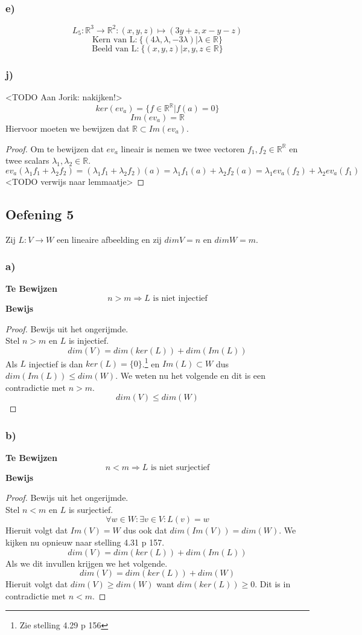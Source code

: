 \documentclass[lineaire_algebra_oplossingen.tex]{subfiles}
\begin{document}
\subsubsection*{e)}
$$
L_5:\mathbb{R}^3\rightarrow\mathbb{R}^2:(x,y,z)\mapsto (3y+z,x-y-z)
$$
$$
\text{Kern van L:} \ \{(4\lambda ,\lambda ,-3\lambda)|\lambda \in \mathbb{R} \}
$$
$$
\text{Beeld van L:} \ \{(x ,y ,z)|x,y,z \in \mathbb{R} \}
$$

\subsubsection*{j)}
<TODO Aan Jorik: nakijken!>
\[
ker(ev_a) = \{ f \in \mathbb{R}^{\mathbb{R}} | f(a) = 0\}
\]
\[
Im(ev_a) = \mathbb{R}
\]
Hiervoor moeten we bewijzen dat $\mathbb{R} \subset Im(ev_a)$.
\begin{proof}
Om te bewijzen dat $ev_a$ lineair is nemen we twee vectoren $f_1,f_2 \in \mathbb{R}^{\mathbb{R}}$ en twee scalars $\lambda_1, \lambda_2 \in \mathbb{R}$.
\[
ev_a(\lambda_1f_1 + \lambda_2f_2) = (\lambda_1f_1 + \lambda_2f_2)(a) = \lambda_1f_1(a) + \lambda_2f_2(a) = \lambda_1ev_a(f_2) + \lambda_2ev_a(f_1)
\]
<TODO verwijs naar lemmaatje>
\end{proof}

\subsection{Oefening 5}
Zij $L:V \rightarrow W$ een lineaire afbeelding en zij $dim V = n$ en $dim W = m$.\\
\subsubsection*{a)}
\textbf{Te Bewijzen}
\[
n > m \Rightarrow L \text{ is niet injectief}
\]
\textbf{Bewijs}
\begin{proof}
Bewijs uit het ongerijmde.\\
Stel $n>m$ en $L$ is injectief.
\[
dim(V) = dim(ker(L)) + dim(Im(L))
\]
Als $L$ injectief is dan $ker(L)=\{0\}$.\footnote{Zie stelling 4.29 p 156} en $Im(L) \subset W$ dus $dim(Im(L))\le dim(W)$. We weten nu het volgende en dit is een contradictie met $n>m$.
\[
dim(V) \le dim(W)
\]
\end{proof}
\subsubsection*{b)}
\textbf{Te Bewijzen}
\[
n < m \Rightarrow L \text{ is niet surjectief}
\]
\textbf{Bewijs}
\begin{proof}
Bewijs uit het ongerijmde.\\
Stel $n<m$ en $L$ is surjectief.
\[
\forall w\in W:\exists v\in V: L(v)=w
\]
Hieruit volgt dat $Im(V)=W$ dus ook dat $dim(Im(V))=dim(W)$.
We kijken nu opnieuw naar stelling 4.31 p 157.
\[
dim(V) = dim(ker(L)) + dim(Im(L))
\]
Als we dit invullen krijgen we het volgende.
\[
dim(V) = dim(ker(L)) + dim(W)
\]
Hieruit volgt dat $dim(V) \ge dim(W)$ want $dim(ker(L)) \ge 0$. Dit is in contradictie met $n<m$.
\end{proof}
\end{document}
